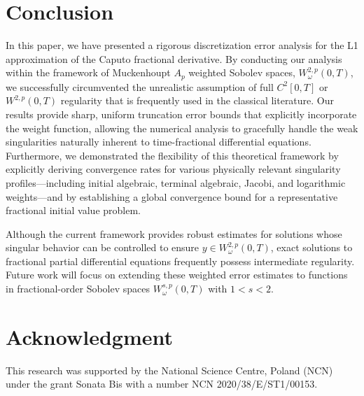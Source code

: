\documentclass[12pt,a4paper]{article}
\theoremstyle{definition}
\begin{document}
\section{Conclusion}

In this paper, we have presented a rigorous discretization error analysis for the L1 approximation of the Caputo fractional derivative. By conducting our analysis within the framework of Muckenhoupt $A_p$ weighted Sobolev spaces, $W^{2,p}_\omega(0,T)$, we successfully circumvented the unrealistic assumption of full $C^2[0,T]$ or $W^{2,p}(0,T)$ regularity that is frequently used in the classical literature. Our results provide sharp, uniform truncation error bounds that explicitly incorporate the weight function, allowing the numerical analysis to gracefully handle the weak singularities naturally inherent to time-fractional differential equations. Furthermore, we demonstrated the flexibility of this theoretical framework by explicitly deriving convergence rates for various physically relevant singularity profiles—including initial algebraic, terminal algebraic, Jacobi, and logarithmic weights—and by establishing a global convergence bound for a representative fractional initial value problem.

Although the current framework provides robust estimates for solutions whose singular behavior can be controlled to ensure $y \in W^{2,p}_\omega(0,T)$, exact solutions to fractional partial differential equations frequently possess intermediate regularity. Future work will focus on extending these weighted error estimates to functions in fractional-order Sobolev spaces $W^{s,p}_\omega(0,T)$ with $1 < s < 2$.

\section*{Acknowledgment}
This research was supported by the National Science Centre, Poland (NCN) under the grant Sonata Bis with a number NCN 2020/38/E/ST1/00153.



\end{document}

